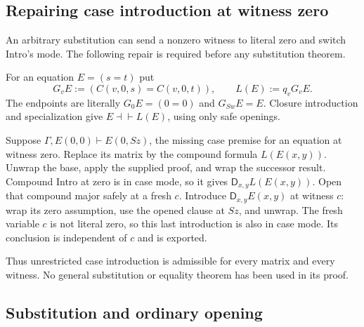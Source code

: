 \documentclass[11pt]{article}
\theoremstyle{definition}
\theoremstyle{remark}
\newcommand{\D}{\mathsf D}
\newcommand{\der}{\vdash}
\newcommand{\inter}{\dashv\vdash}
\begin{document}
\subsection{Repairing case introduction at witness zero}

An arbitrary substitution can send a nonzero witness to
literal zero and switch Intro's mode. The following repair
is required before any substitution theorem.

For an equation $E=(s=t)$ put
\[
 G_vE:=(C(v,0,s)=C(v,0,t)),\qquad
 L(E):=q_vG_vE.
\]
The endpoints are literally $G_0E=(0=0)$ and $G_{Sw}E=E$.
Closure introduction and specialization give
$E\inter L(E)$, using only safe openings.

Suppose $\Gamma,E(0,0)\der E(0,Sz)$, the missing case
premise for an equation at witness zero. Replace its
matrix by the compound formula $L(E(x,y))$.
Unwrap the base, apply the supplied proof, and wrap the
successor result. Compound Intro at zero is in case mode,
so it gives $\D_{x,y}L(E(x,y))$. Open that compound major
safely at a fresh $c$. Introduce $\D_{x,y}E(x,y)$ at
witness $c$: wrap its zero assumption, use the opened
clause at $Sz$, and unwrap. The fresh variable $c$ is not
literal zero, so this last introduction is also in case
mode. Its conclusion is independent of $c$ and is exported.

Thus unrestricted case introduction is admissible for
every matrix and every witness. No general substitution
or equality theorem has been used in its proof.

\subsection{Substitution and ordinary opening}
\end{document}
